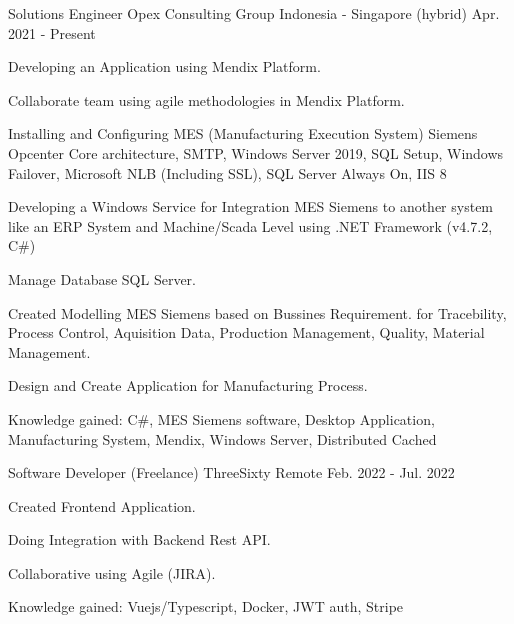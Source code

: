 

\begin{cventries}

\cventry
{Solutions Engineer} %
{Opex Consulting Group} %
{Indonesia - Singapore (hybrid)} %
{Apr. 2021 - Present} %
{
  \begin{cvitems} %
    \item {Developing an Application using Mendix Platform.}
    \item {Collaborate team using agile methodologies in Mendix Platform.}
    \item {Installing and Configuring MES (Manufacturing Execution System) Siemens Opcenter Core architecture, SMTP, Windows Server 2019, SQL Setup, Windows Failover, Microsoft NLB (Including SSL), SQL Server Always On, IIS 8}
    \item {Developing a Windows Service for Integration MES Siemens to another system like an ERP System and Machine/Scada Level using .NET Framework (v4.7.2, C\#)}
    \item {Manage Database SQL Server.}
    \item {Created Modelling MES Siemens based on Bussines Requirement. for Tracebility, Process Control, Aquisition Data, Production Management, Quality, Material Management.}
    \item {Design and Create Application for Manufacturing Process.}
    \item {Knowledge gained: C\#, MES Siemens software, Desktop Application, Manufacturing System, Mendix, Windows Server, Distributed Cached}
  \end{cvitems}
}

  \cventry
  {Software Developer (Freelance)} %
  {ThreeSixty} %
  {Remote} %
  {Feb. 2022 - Jul. 2022} %
  {
    \begin{cvitems} %
      \item {Created Frontend Application.}
      \item {Doing Integration with Backend Rest API.}
      \item {Collaborative using Agile (JIRA).}
      \item {Knowledge gained: Vuejs/Typescript, Docker, JWT auth, Stripe}
    \end{cvitems}
  }
  


\end{cventries}
